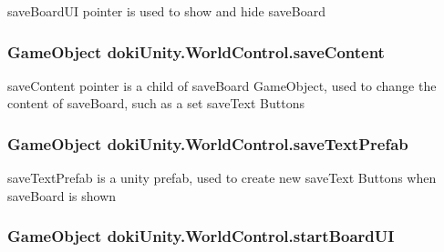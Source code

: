 save\+Board\+UI pointer is used to show and hide save\+Board 

\subsubsection[{\texorpdfstring{save\+Content}{saveContent}}]{\setlength{\rightskip}{0pt plus 5cm}Game\+Object doki\+Unity.\+World\+Control.\+save\+Content}\hypertarget{classdoki_unity_1_1_world_control_a7e11b2dcb01ad0f244644b6cf2d08b84}{}\label{classdoki_unity_1_1_world_control_a7e11b2dcb01ad0f244644b6cf2d08b84}


save\+Content pointer is a child of save\+Board Game\+Object, used to change the content of save\+Board, such as a set save\+Text Buttons 

\subsubsection[{\texorpdfstring{save\+Text\+Prefab}{saveTextPrefab}}]{\setlength{\rightskip}{0pt plus 5cm}Game\+Object doki\+Unity.\+World\+Control.\+save\+Text\+Prefab}\hypertarget{classdoki_unity_1_1_world_control_a4b65998064f8be0d9c5671305f06d0ce}{}\label{classdoki_unity_1_1_world_control_a4b65998064f8be0d9c5671305f06d0ce}


save\+Text\+Prefab is a unity prefab, used to create new save\+Text Buttons when save\+Board is shown 

\subsubsection[{\texorpdfstring{start\+Board\+UI}{startBoardUI}}]{\setlength{\rightskip}{0pt plus 5cm}Game\+Object doki\+Unity.\+World\+Control.\+start\+Board\+UI}\hypertarget{classdoki_unity_1_1_world_control_a0749c8bf0a4cd1dc9049ffabfc14e6c9}{}\label{classdoki_unity_1_1_world_control_a0749c8bf0a4cd1dc9049ffabfc14e6c9}


